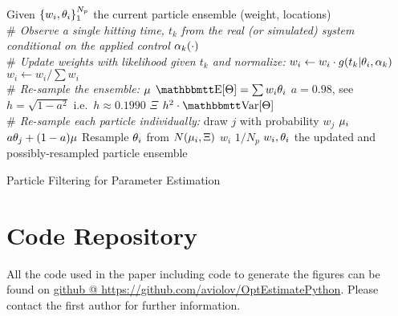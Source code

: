 \documentclass[12pt]{article}
\begin{document}
\begin{algorithm}
\begin{algorithmic}
\State Given  $\{w_i, {\theta}_i\}_1^{N_p}$ the current particle ensemble (weight,
locations)  
\\ {\itshape $\#$ Observe a single hitting time, $t_k$ from the real (or
simulated) system conditional on the applied control ${\alpha}_k(\cdot)$}
\\ {\itshape $\#$ Update weights with likelihood given $t_k$ and normalize:}
\State $w_{i } \gets w_{i }\cdot g(t_k| {\theta}_i, {\alpha}_k)$
\State $w_{i } \gets w_{i }/ \sum w_i$
\\ {\itshape $\#$ Re-sample the ensemble:}
\State ${\mu }$ \gets $\Exp[\Th] = \sum w_i \th_i$ 
\State $a = 0.98$, see
\cite{Granade2012,Liu2001} 
\State $h = \sqrt{1-a^2}$ i.e.\ $h \approx 0.1990$
\State $\Xi$ \gets $h^2\cdot \Var[\Th]$
	\\ {\itshape $\#$ Re-sample each particle individually:}
	\State draw $j$ with probability $w_j$ 
	\State ${\mu }_i$ \gets  $a {\theta}_j + (1-a) {\mu }$
	\State Resample ${\theta}_i$ from $N({\mu }_i, \Xi)$
	\State $w_i$ \gets $1/N_p$ 
\State \Return $w_i, {\theta}_i$ the updated and possibly-resampled particle
ensemble
\end{algorithmic}
\caption{Particle Filtering for Parameter Estimation}
\label{alg:particle_resampling}
\end{algorithm}


\section{Code Repository}
All the code used in the paper including code to generate the figures can be
found on
\href{https://github.com/aviolov/OptEstimatePython}{github @
https://github.com/aviolov/OptEstimatePython}. Please contact the first author
for further information.
\end{document}
